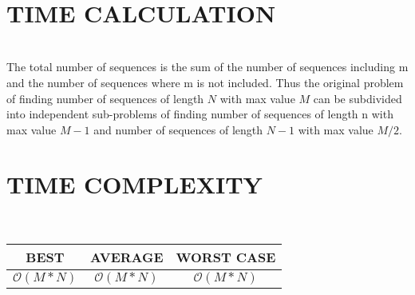 \documentclass[conference]{IEEEtran}
\begin{document}
\\




\section{TIME CALCULATION }\\
The total number of sequences is the sum of the number of sequences including m and the number of sequences where m is not included. Thus the original problem of finding number of sequences of length \begin{math}N\end{math} with max value \begin{math}M\end{math} can be subdivided into independent sub-problems of finding number of sequences of length n with max value \begin{math}M-1\end{math} and number of sequences of length \begin{math}N-1\end{math} with max value \begin{math}M/2\end{math}.
\begin{center}
\end{center} 

\section{TIME COMPLEXITY}\\
\begin{center}
 \begin{tabular}{||c c c||} 
 \hline
  BEST & AVERAGE & WORST CASE  \\  
 \hline\hline
 \begin{math} \mathcal{O}(M*N)\end{math} & \begin{math} \mathcal{O}(M*N)\end{math} & \begin{math} \mathcal{O}(M*N)\end{math} \\ 
 \hline
\end{tabular}
\end{center}
\end{document}
